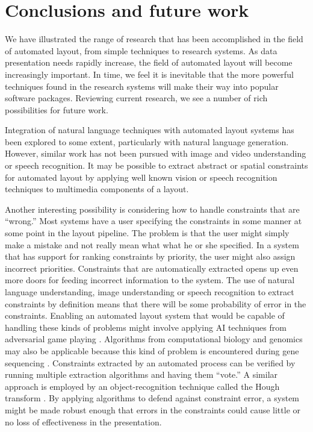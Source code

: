     \section{Conclusions and future work}
    \label{conclusions-layout-paper}

		We have illustrated the range of research that has been accomplished in the
		field of automated layout, from simple techniques to research systems. As
		data presentation needs rapidly increase, the field of automated layout
		will become increasingly important. In time, we feel it is inevitable that
		the more powerful techniques found in the research systems will make their
		way into popular software packages. Reviewing current research, we see a
		number of rich possibilities for future work.

		Integration of natural language techniques with automated layout systems
		has been explored to some extent, particularly with natural language
		generation. However, similar work has not been pursued with image and video
		understanding or speech recognition. It may be possible to extract abstract
		or spatial constraints for automated layout by applying well known vision
		or speech recognition techniques to multimedia components of a layout.

		Another interesting possibility is considering how to handle constraints
		that are “wrong.” Most systems have a user specifying the constraints in
		some manner at some point in the layout pipeline. The problem is that the
		user might simply make a mistake and not really mean what what he or she
		specified. In a system that has support for ranking constraints by
		priority, the user might also assign incorrect priorities. Constraints that
		are automatically extracted opens up even more doors for feeding incorrect
		information to the system. The use of natural language understanding, image
		understanding or speech recognition to extract constraints by definition
		means that there will be some probability of error in the constraints.
		Enabling an automated layout system that would be capable of handling these
		kinds of problems might involve applying AI techniques from adversarial
		game playing \citep{nilsson-1}. Algorithms from computational biology and
		genomics may also be applicable because this kind of problem is encountered
		during gene sequencing \citep{salzberg-1}. Constraints extracted by an
		automated process can be verified by running multiple extraction algorithms
		and having them “vote.” A similar approach is employed by an
		object-recognition technique called the Hough transform \citep{horn-1}. By
		applying algorithms to defend against constraint error, a system might be
		made robust enough that errors in the constraints could cause little or no
		loss of effectiveness in the presentation.


